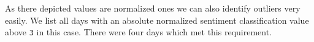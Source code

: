 
As there depicted values are normalized ones we can also identify outliers very easily.
We list all days with an absolute normalized sentiment classification value above \texttt{3} in this case.
There were four days which met this requirement.

